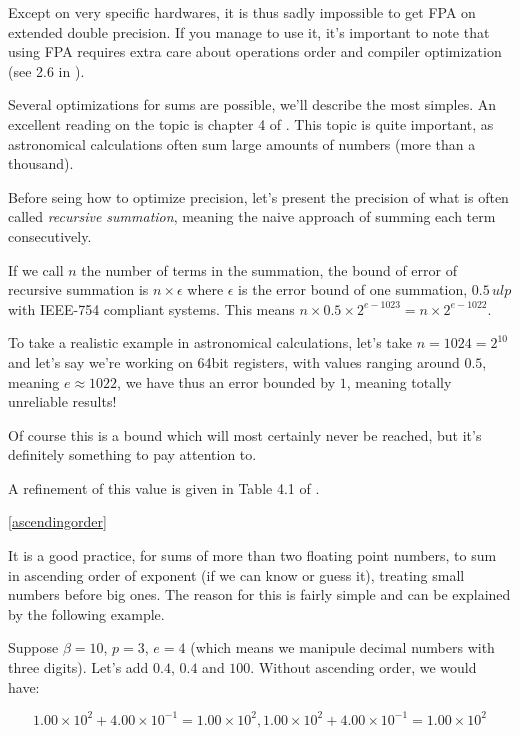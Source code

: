 Except on very specific hardwares, it is thus sadly impossible to get FPA on extended double precision. If you manage to use it, it's important to note that using FPA requires extra care about operations order and compiler optimization (see 2.6 in \cite{Higham}).

\label{summations}

Several optimizations for sums are possible, we'll describe the most simples. An excellent reading on the topic is chapter 4 of \cite{Higham}. This topic is quite important, as astronomical calculations often sum large amounts of numbers (more than a thousand).


Before seing how to optimize precision, let's present the precision of what is often called \emph{recursive summation}, meaning the naive approach of summing each term consecutively.

If we call $n$ the number of terms in the summation, the bound of error of recursive summation is $n\times\epsilon$ where $\epsilon$ is the error bound of one summation, $0.5\,ulp$ with IEEE-754 compliant systems. This means $n\times0.5\times2^{e-1023} = n\times2^{e-1022}$.

To take a realistic example in astronomical calculations, let's take $n=1024=2^{10}$ and let's say we're working on 64bit registers, with values ranging around $0.5$, meaning $e\approx1022$, we have thus an error bounded by $1$, meaning totally unreliable results!

Of course this is a bound which will most certainly never be reached, but it's definitely something to pay attention to.

A refinement of this value is given in Table 4.1 of  \cite{Higham}.

\ref{ascendingorder}

It is a good practice, for sums of more than two floating point numbers, to sum in ascending order of exponent (if we can know or guess it), treating small numbers before big ones. The reason for this is fairly simple and can be explained by the following example.

Suppose $\beta=10$, $p=3$, $e=4$ (which means we manipule decimal numbers with three digits). Let's add $0.4$, $0.4$ and $100$. Without ascending order, we would have:

$$1.00\times 10^2 + 4.00\times 10^{-1} = 1.00\times 10^2, 1.00\times 10^2 + 4.00\times 10^{-1} = 1.00\times 10^2$$

